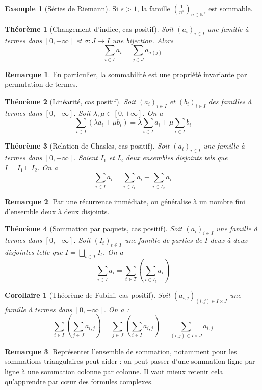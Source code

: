 \documentclass[french]{book}
\newcommand{\N}{\mathbb{N}}
\newcommand{\st}{^\star}
\theoremstyle{plain}
\newtheorem{thm}{Théorème}[chapter]
\newtheorem{cor}{Corollaire}[chapter]
\theoremstyle{definition}
\newtheorem{exa}{Exemple}[chapter]
\newtheorem{rmq}{Remarque}[chapter]
\theoremstyle{remark}
\begin{document}
\begin{exa}[Séries de Riemann]
	Si $s>1$, la famille $\displaystyle \left(\frac{1}{n^s}\right)_{n\in\N\st}$  est sommable.
\end{exa}
\begin{thm}[Changement d'indice, cas positif]
	Soit $(a_i)_{i\in I}$ une famille à termes dans $[0,+\infty]$ et $\sigma:J\rightarrow I$ une bijection. Alors $$\sum_{i\in I}a_i=\sum_{j\in J}a_{\sigma(j)}$$
\end{thm}
\begin{rmq} En particulier, la sommabilité est une propriété invariante par permutation de termes. \end{rmq}
\begin{thm}[Linéarité, cas positif]
	Soit $(a_i)_{i\in I}$ et $(b_i)_{i\in I}$ des familles à termes dans $[0,+\infty]$. Soit $\lambda,\mu \in[0,+\infty]$. On a $$\sum_{i\in I}(\lambda a_i+\mu b_i)=\lambda\sum_{i\in I}a_i+\mu\sum_{i\in I}b_i$$
\end{thm}
\begin{thm}[Relation de Chasles, cas positif]
	Soit $(a_i)_{i\in I}$ une famille à termes dans $[0,+\infty]$. Soient $I_1$ et $I_2$ deux ensembles disjoints tels que $I=I_1\sqcup I_2$. On a $$\sum_{i\in I}a_i=\sum_{i\in I_1}a_i+\sum_{i\in I_2}a_i$$
\end{thm}
\begin{rmq} Par une récurrence immédiate, on généralise à un nombre fini d'ensemble deux à deux disjoints. \end{rmq}
\begin{thm}[Sommation par paquets, cas positif]
	Soit $(a_i)_{i\in I}$ une famille à termes dans $[0,+\infty]$. Soit $(I_t)_{t\in T}$ une famille de parties de $I$ deux à deux disjointes telle que $\displaystyle I=\bigsqcup_{t\in T}I_t$. On a $$\sum_{i\in I}a_i=\sum_{t\in T}\left(\sum_{i\in I_t}a_i\right)$$
\end{thm}
\begin{cor}[Théorème de Fubini, cas positif]
	Soit $(a_{i,j})_{(i,j)\in I\times J}$  une famille à termes dans $[0,+\infty]$. On a : $$\sum_{i\in I}\left(\sum_{j\in J}a_{i,j}\right)=\sum_{j\in J}\left(\sum_{i\in I}a_{i,j}\right)=\sum_{(i,j)\in I\times J}a_{i,j}$$
\end{cor}
\begin{rmq} Représenter l'ensemble de sommation, notamment pour les sommations triangulaires peut aider : on peut passer d'une sommation ligne par ligne à une sommation colonne par colonne. Il vaut mieux retenir cela qu'apprendre par cœur  des formules complexes. \end{rmq}
\end{document}
